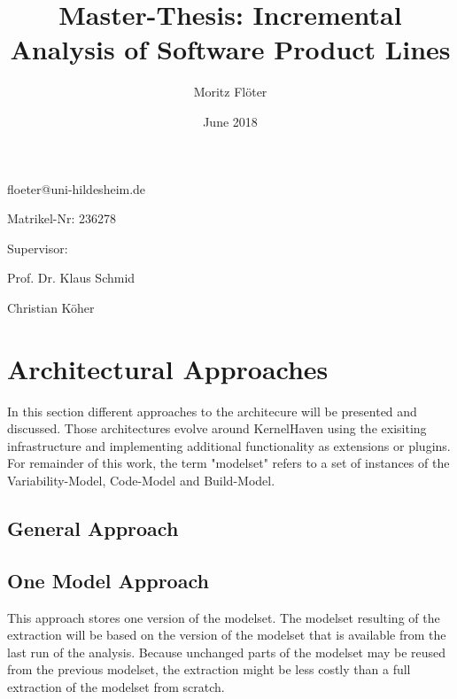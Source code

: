 \documentclass[a4paper]{article}
\title{Master-Thesis: Incremental Analysis of Software Product Lines}
\author{Moritz Fl\"oter}
\date{June 2018}
\begin{document}


\maketitle
\newblock

\begin{center}
floeter@uni-hildesheim.de \par
Matrikel-Nr: 236278 \par
Supervisor: \par
Prof. Dr. Klaus Schmid \par
Christian K\"oher
\end{center}

\newpage
\lhead{{}}
\rhead{\leftmark}
\pagestyle{fancy}

\tableofcontents
\newpage


\maketitle
\newpage

\setcounter{page}{1}
\lhead{{}}
\rhead{\leftmark}
\pagestyle{fancy}

\section{Architectural Approaches}

In this section different approaches to the architecure will be presented and discussed. Those architectures evolve around KernelHaven using the exisiting infrastructure and implementing additional functionality as extensions or plugins. For remainder of this work, the term "modelset" refers to a set of instances of the Variability-Model, Code-Model and Build-Model.

\subsection{General Approach}


\subsection{One Model Approach} \label{one}
This approach stores one version of the modelset. The modelset resulting of the extraction will be based on the version of the modelset that is available from the last run of the analysis. Because unchanged parts of the modelset may be reused from the previous modelset, the extraction might be less costly than a full extraction of the modelset from scratch.
\end{document}
